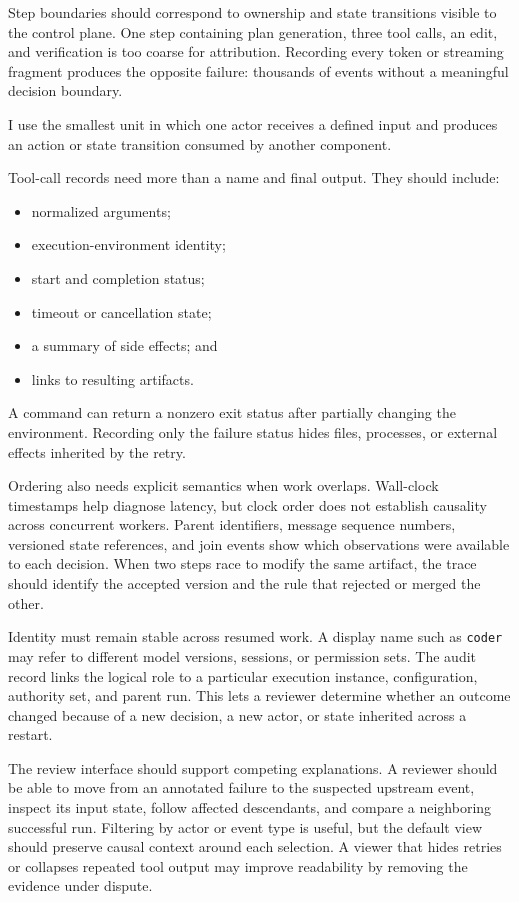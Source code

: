 Step boundaries should correspond to ownership and state transitions visible to the control plane. One step containing plan generation, three tool calls, an edit, and verification is too coarse for attribution. Recording every token or streaming fragment produces the opposite failure: thousands of events without a meaningful decision boundary.

I use the smallest unit in which one actor receives a defined input and produces an action or state transition consumed by another component.


Tool-call records need more than a name and final output. They should include:

\begin{itemize}
\tightlist
\item
  normalized arguments;
\item
  execution-environment identity;
\item
  start and completion status;
\item
  timeout or cancellation state;
\item
  a summary of side effects; and
\item
  links to resulting artifacts.
\end{itemize}

A command can return a nonzero exit status after partially changing the environment. Recording only the failure status hides files, processes, or external effects inherited by the retry.

Ordering also needs explicit semantics when work overlaps. Wall-clock timestamps help diagnose latency, but clock order does not establish causality across concurrent workers. Parent identifiers, message sequence numbers, versioned state references, and join events show which observations were available to each decision. When two steps race to modify the same artifact, the trace should identify the accepted version and the rule that rejected or merged the other.

Identity must remain stable across resumed work. A display name such as \texttt{coder} may refer to different model versions, sessions, or permission sets. The audit record links the logical role to a particular execution instance, configuration, authority set, and parent run. This lets a reviewer determine whether an outcome changed because of a new decision, a new actor, or state inherited across a restart.

The review interface should support competing explanations. A reviewer should be able to move from an annotated failure to the suspected upstream event, inspect its input state, follow affected descendants, and compare a neighboring successful run. Filtering by actor or event type is useful, but the default view should preserve causal context around each selection. A viewer that hides retries or collapses repeated tool output may improve readability by removing the evidence under dispute.

